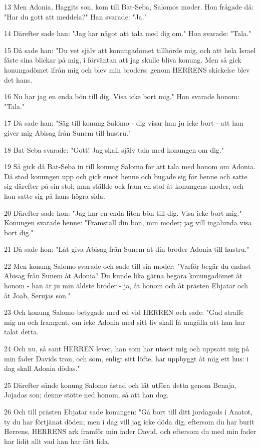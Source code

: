 \par 13 Men Adonia, Haggits son, kom till Bat-Seba, Salomos moder. Hon frågade då: "Har du gott att meddela?" Han svarade: "Ja."
\par 14 Därefter sade han: "Jag har något att tala med dig om." Hon svarade: "Tala."
\par 15 Då sade han: "Du vet själv att konungadömet tillhörde mig, och att hela Israel fäste sina blickar på mig, i förväntan att jag skulle bliva konung. Men så gick konungadömet ifrån mig och blev min broders; genom HERRENS skickelse blev det hans.
\par 16 Nu har jag en enda bön till dig. Visa icke bort mig." Hon svarade honom: "Tala."
\par 17 Då sade han: "Säg till konung Salomo - dig visar han ju icke bort - att han giver mig Abisag från Sunem till hustru."
\par 18 Bat-Seba svarade: "Gott! Jag skall själv tala med konungen om dig."
\par 19 Så gick då Bat-Seba in till konung Salomo för att tala med honom om Adonia. Då stod konungen upp och gick emot henne och bugade sig för henne och satte sig därefter på sin stol; man ställde ock fram en stol åt konungens moder, och hon satte sig på hans högra sida.
\par 20 Därefter sade hon: "Jag har en enda liten bön till dig. Visa icke bort mig." Konungen svarade henne: "Framställ din bön, min moder; jag vill ingalunda visa bort dig."
\par 21 Då sade hon: "Låt giva Abisag från Sunem åt din broder Adonia till hustru."
\par 22 Men konung Salomo svarade och sade till sin moder: "Varför begär du endast Abisag från Sunem åt Adonia? Du kunde lika gärna begära konungadömet åt honom - han är ju min äldste broder - ja, åt honom och åt prästen Ebjatar och åt Joab, Serujas son."
\par 23 Och konung Salomo betygade med ed vid HERREN och sade: "Gud straffe mig nu och framgent, om icke Adonia med sitt liv skall få umgälla att han har talat detta.
\par 24 Och nu, så sant HERREN lever, han som har utsett mig och uppsatt mig på min fader Davids tron, och som, enligt sitt löfte, har uppbyggt åt mig ett hus: i dag skall Adonia dödas."
\par 25 Därefter sände konung Salomo åstad och lät utföra detta genom Benaja, Jojadas son; denne stötte ned honom, så att han dog.
\par 26 Och till prästen Ebjatar sade konungen: "Gå bort till ditt jordagods i Anatot, ty du har förtjänat döden; men i dag vill jag icke döda dig, eftersom du har burit Herrens, HERRENS ark framför min fader David, och eftersom du med min fader har lidit allt vad han har fått lida.
